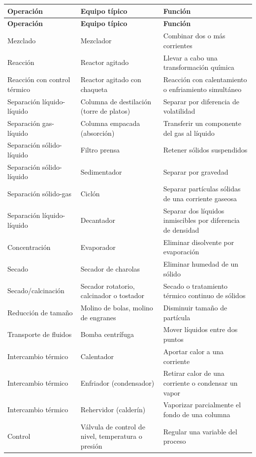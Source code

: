 \renewcommand{\arraystretch}{1.4}
\begin{longtable}{|L{4.5cm}|L{4cm}|L{5cm}|}
\hline
\textbf{Operación} & \textbf{Equipo típico} & \textbf{Función} \\
\hline
\endfirsthead
\hline
\textbf{Operación} & \textbf{Equipo típico} & \textbf{Función} \\
\hline
\endhead
\endlastfoot

Mezclado & Mezclador & Combinar dos o más corrientes \\
\hline
Reacción & Reactor agitado & Llevar a cabo una transformación
química \\
\hline
Reacción con control térmico & Reactor agitado con chaqueta &
Reacción con calentamiento o enfriamiento simultáneo \\
\hline
Separación líquido-líquido & Columna de destilación (torre de
platos) & Separar por diferencia de volatilidad \\
\hline
Separación gas-líquido & Columna empacada (absorción) & Transferir
un componente del gas al líquido \\
\hline
Separación sólido-líquido & Filtro prensa & Retener sólidos
suspendidos \\
\hline
Separación sólido-líquido & Sedimentador & Separar por gravedad \\
\hline
Separación sólido-gas & Ciclón & Separar partículas sólidas de
una corriente gaseosa \\
\hline
Separación líquido-líquido & Decantador & Separar dos líquidos
inmiscibles por diferencia de densidad \\
\hline
Concentración & Evaporador & Eliminar disolvente por evaporación \\
\hline
Secado & Secador de charolas & Eliminar humedad de un sólido \\
\hline
Secado/calcinación & Secador rotatorio, calcinador o tostador &
Secado o tratamiento térmico continuo de sólidos \\
\hline
Reducción de tamaño & Molino de bolas, molino de engranes &
Disminuir tamaño de partícula \\
\hline
Transporte de fluidos & Bomba centrífuga & Mover líquidos entre
dos puntos \\
\hline
Intercambio térmico & Calentador & Aportar calor a una corriente \\
\hline
Intercambio térmico & Enfriador (condensador) & Retirar calor de
una corriente o condensar un vapor \\
\hline
Intercambio térmico & Rehervidor (calderín) & Vaporizar
parcialmente el fondo de una columna \\
\hline
Control & Válvula de control de nivel, temperatura o presión &
Regular una variable del proceso \\
\hline

\end{longtable}
\renewcommand{\arraystretch}{1}

